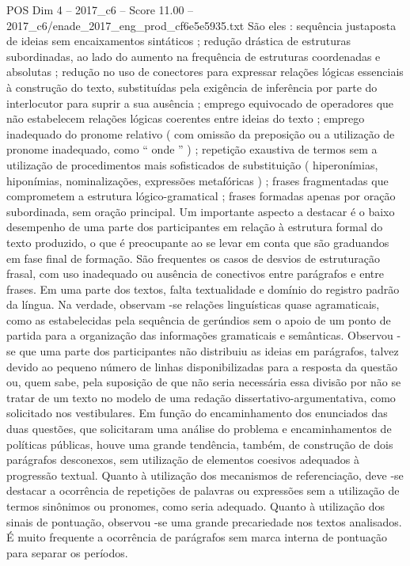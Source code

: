\begin{textsample}{POS Dim 4 – 2017\_c6 – Score 11.00 – 2017\_c6/enade\_2017\_eng\_prod\_cf6e5e5935.txt}
São eles : sequência justaposta de ideias sem encaixamentos sintáticos ; redução drástica de estruturas subordinadas, ao lado do aumento na frequência de estruturas coordenadas e absolutas ; redução no uso de conectores para expressar relações lógicas essenciais à construção do texto, substituídas pela exigência de inferência por parte do interlocutor para suprir a sua ausência ; emprego equivocado de operadores que não estabelecem relações lógicas coerentes entre ideias do texto ; emprego inadequado do pronome relativo ( com omissão da preposição ou a utilização de pronome inadequado, como “ onde ” ) ; repetição exaustiva de termos sem a utilização de procedimentos mais sofisticados de substituição ( hiperonímias, hiponímias, nominalizações, expressões metafóricas ) ; frases fragmentadas que comprometem a estrutura lógico-gramatical ; frases formadas apenas por oração subordinada, sem oração principal.
Um importante aspecto a destacar é o baixo desempenho de uma parte dos participantes em relação à estrutura formal do texto produzido, o que é preocupante ao se levar em conta que são graduandos em fase final de formação.
São frequentes os casos de desvios de estruturação frasal, com uso inadequado ou ausência de conectivos entre parágrafos e entre frases.
Em uma parte dos textos, falta textualidade e domínio do registro padrão da língua.
Na verdade, observam -se relações linguísticas quase agramaticais, como as estabelecidas pela sequência de gerúndios sem o apoio de um ponto de partida para a organização das informações gramaticais e semânticas.
Observou -se que uma parte dos participantes não distribuiu as ideias em parágrafos, talvez devido ao pequeno número de linhas disponibilizadas para a resposta da questão ou, quem sabe, pela suposição de que não seria necessária essa divisão por não se tratar de um texto no modelo de uma redação dissertativo-argumentativa, como solicitado nos vestibulares.
Em função do encaminhamento dos enunciados das duas questões, que solicitaram uma análise do problema e encaminhamentos de políticas públicas, houve uma grande tendência, também, de construção de dois parágrafos desconexos, sem utilização de elementos coesivos adequados à progressão textual.
Quanto à utilização dos mecanismos de referenciação, deve -se destacar a ocorrência de repetições de palavras ou expressões sem a utilização de termos sinônimos ou pronomes, como seria adequado.
Quanto à utilização dos sinais de pontuação, observou -se uma grande precariedade nos textos analisados.
É muito frequente a ocorrência de parágrafos sem marca interna de pontuação para separar os períodos.

\end{textsample}
